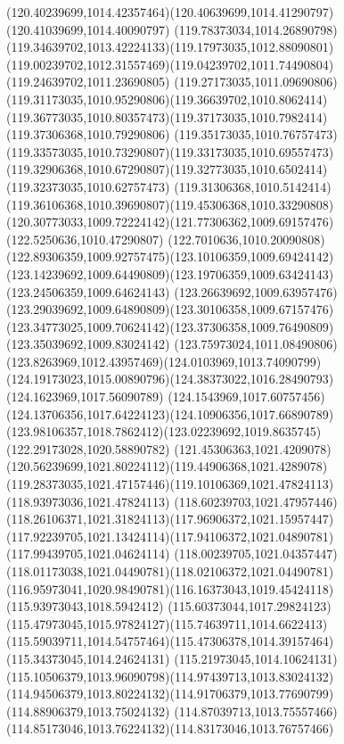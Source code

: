 {{	\curveto(120.40239699,1014.42357464)(120.40639699,1014.41290797)(120.41039699,1014.40090797)
	\curveto(119.78373034,1014.26890798)(119.34639702,1013.42224133)(119.17973035,1012.88090801)
	\curveto(119.00239702,1012.31557469)(119.04239702,1011.74490804)(119.24639702,1011.23690805)
	\curveto(119.27173035,1011.09690806)(119.31173035,1010.95290806)(119.36639702,1010.8062414)
	\curveto(119.36773035,1010.80357473)(119.37173035,1010.7982414)(119.37306368,1010.79290806)
	\curveto(119.35173035,1010.76757473)(119.33573035,1010.73290807)(119.33173035,1010.69557473)
	\curveto(119.32906368,1010.67290807)(119.32773035,1010.6502414)(119.32373035,1010.62757473)
	\curveto(119.31306368,1010.5142414)(119.36106368,1010.39690807)(119.45306368,1010.33290808)
	\curveto(120.30773033,1009.72224142)(121.77306362,1009.69157476)(122.5250636,1010.47290807)
	\curveto(122.7010636,1010.20090808)(122.89306359,1009.92757475)(123.10106359,1009.69424142)
	\curveto(123.14239692,1009.64490809)(123.19706359,1009.63424143)(123.24506359,1009.64624143)
	\curveto(123.26639692,1009.63957476)(123.29039692,1009.64890809)(123.30106358,1009.67157476)
	\curveto(123.34773025,1009.70624142)(123.37306358,1009.76490809)(123.35039692,1009.83024142)
	\curveto(123.75973024,1011.08490806)(123.8263969,1012.43957469)(124.0103969,1013.74090799)
	\curveto(124.19173023,1015.00890796)(124.38373022,1016.28490793)(124.1623969,1017.56090789)
	\curveto(124.1543969,1017.60757456)(124.13706356,1017.64224123)(124.10906356,1017.66890789)
	\curveto(123.98106357,1018.7862412)(123.02239692,1019.8635745)(122.29173028,1020.58890782)
	\curveto(121.45306363,1021.4209078)(120.56239699,1021.80224112)(119.44906368,1021.4289078)
	\curveto(119.28373035,1021.47157446)(119.10106369,1021.47824113)(118.93973036,1021.47824113)
	\curveto(118.60239703,1021.47957446)(118.26106371,1021.31824113)(117.96906372,1021.15957447)
	\curveto(117.92239705,1021.13424114)(117.94106372,1021.04890781)(117.99439705,1021.04624114)
	\curveto(118.00239705,1021.04357447)(118.01173038,1021.04490781)(118.02106372,1021.04490781)
	\curveto(116.95973041,1020.98490781)(116.16373043,1019.45424118)(115.93973043,1018.5942412)
	\curveto(115.60373044,1017.29824123)(115.47973045,1015.97824127)(115.74639711,1014.6622413)
	\curveto(115.59039711,1014.54757464)(115.47306378,1014.39157464)(115.34373045,1014.24624131)
	\curveto(115.21973045,1014.10624131)(115.10506379,1013.96090798)(114.97439713,1013.83024132)
	\curveto(114.94506379,1013.80224132)(114.91706379,1013.77690799)(114.88906379,1013.75024132)
	\curveto(114.87039713,1013.75557466)(114.85173046,1013.76224132)(114.83173046,1013.76757466)
}}
